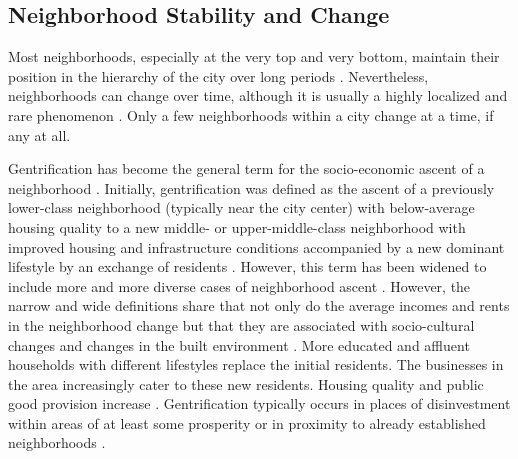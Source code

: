 \subsection{Neighborhood Stability and Change}

Most neighborhoods, especially at the very top and very bottom, maintain their position in the hierarchy of the city over long periods \citep{solariAffluentNeighborhoodPersistence2012, owensNeighborhoodsRiseTypology2012, rosenthalChangePersistenceEconomic2015}. Nevertheless, neighborhoods can change over time, although it is usually a highly localized and rare phenomenon \citep{solariAffluentNeighborhoodPersistence2012, owensNeighborhoodsRiseTypology2012, brown-saracinoExplicatingDividedApproaches2017}. Only a few neighborhoods within a city change at a time, if any at all. 

Gentrification has become the general term for the socio-economic ascent of a neighborhood \citep{owensNeighborhoodsRiseTypology2012}. Initially, gentrification was defined as the ascent of a previously lower-class neighborhood (typically near the city center) with below-average housing quality to a new middle- or upper-middle-class neighborhood with improved housing and infrastructure conditions accompanied by a new dominant lifestyle by an exchange of residents \citep{zukinGentrificationCultureCapital1987}. However, this term has been widened to include more and more diverse cases of neighborhood ascent \citep[530ff]{owensNeighborhoodsRiseTypology2012, brown-saracinoExplicatingDividedApproaches2017}. However, the narrow and wide definitions share that not only do the average incomes and rents in the neighborhood change but that they are associated with socio-cultural changes and changes in the built environment \citep{redfernWhatMakesGentrification2003}. More educated and affluent households with different lifestyles replace the initial residents. The businesses in the area increasingly cater to these new residents. Housing quality and public good provision increase \citep{zukinGentrificationCultureCapital1987}. Gentrification typically occurs in places of disinvestment within areas of at least some prosperity \citep{leyAlternativeExplanationsInnerCity1986, atkinsonEvidenceImpactGentrification2004} or in proximity to already established neighborhoods \citep{guerrieriEndogenousGentrificationHousing2013}.

